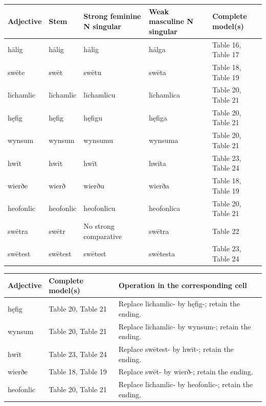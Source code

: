 \par\begingroup
\fontsize{10.5}{13.2}\selectfont
\setlength{\LTleft}{0pt}\setlength{\LTright}{\fill}
\noindent
\begin{tabular}{@{}>{\raggedright\arraybackslash}p{16.83mm}>{\raggedright\arraybackslash}p{16.83mm}>{\raggedright\arraybackslash}p{29.87mm}>{\raggedright\arraybackslash}p{28.19mm}>{\raggedright\arraybackslash}p{21.04mm}@{}}
\toprule
\textbf{Adjective} & \textbf{Stem} & \textbf{Strong feminine N singular} & \textbf{Weak masculine N singular} & \textbf{Complete model(s)} \\
\midrule
hālig & hālig & hālig & hālga & Table 16, Table 17 \\
swēte & swēt & swētu & swēta & Table 18, Table 19 \\
līchamlic & līchamlic & līchamlicu & līchamlica & Table 20, Table 21 \\
hęfig & hęfig & hęfigu & hęfiga & Table 20, Table 21 \\
wynsum & wynsum & wynsumu & wynsuma & Table 20, Table 21 \\
hwīt & hwīt & hwīt & hwīta & Table 23, Table 24 \\
wierðe & wierð & wierðu & wierða & Table 18, Table 19 \\
heofonlic & heofonlic & heofonlicu & heofonlica & Table 20, Table 21 \\
swētra & swētr & No strong comparative & swētra & Table 22 \\
swētest & swētest & swētest & swētesta & Table 23, Table 24 \\
\bottomrule
\end{tabular}
\par\endgroup

\par\begingroup
\fontsize{10.5}{13.2}\selectfont
\setlength{\LTleft}{0pt}\setlength{\LTright}{\fill}
\noindent
\begin{tabular}{@{}>{\raggedright\arraybackslash}p{22.31mm}>{\raggedright\arraybackslash}p{27.89mm}>{\raggedright\arraybackslash}p{68.17mm}@{}}
\toprule
\textbf{Adjective} & \textbf{Complete model(s)} & \textbf{Operation in the corresponding cell} \\
\midrule
hęfig & Table 20, Table 21 & Replace līchamlic- by hęfig-; retain the ending. \\
wynsum & Table 20, Table 21 & Replace līchamlic- by wynsum-; retain the ending. \\
hwīt & Table 23, Table 24 & Replace swētest- by hwīt-; retain the ending. \\
wierðe & Table 18, Table 19 & Replace swēt- by wierð-; retain the ending. \\
heofonlic & Table 20, Table 21 & Replace līchamlic- by heofonlic-; retain the ending. \\
\bottomrule
\end{tabular}
\par\endgroup

